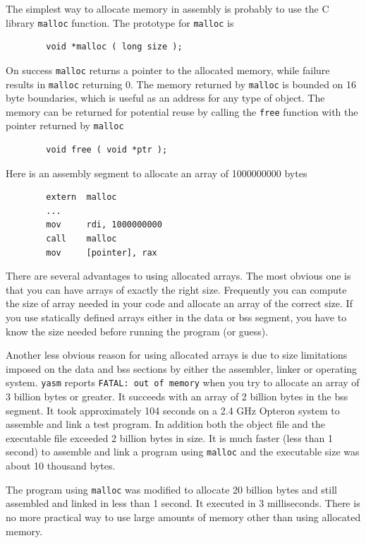 \documentclass[11pt,b5paper]{book}
\begin{document}
The simplest way to allocate memory in assembly is probably to use the C library {\tt malloc} function.
The prototype for {\tt malloc} is
\begin{verbatim}
        void *malloc ( long size );
\end{verbatim}

On success {\tt malloc} returns a pointer to the allocated memory, while failure results in {\tt malloc}
returning 0.
The memory returned by {\tt malloc} is bounded on 16 byte boundaries, which is useful as an address for
any type of object.
The memory can be returned for potential reuse by calling the {\tt free} function with the pointer
returned by {\tt malloc}
\begin{verbatim}
        void free ( void *ptr );
\end{verbatim}

Here is an assembly segment to allocate an array of 1000000000 bytes
\begin{verbatim}
        extern  malloc
        ...
        mov     rdi, 1000000000
        call    malloc
        mov     [pointer], rax
\end{verbatim}

There are several advantages to using allocated arrays.
The most obvious one is that you can have arrays of exactly the right size.
Frequently you can compute the size of array needed in your code and allocate an
array of the correct size.
If you use statically defined arrays either in the data or bss segment, you have to know the
size needed before running the program (or guess).

Another less obvious reason for using allocated arrays is due to size limitations imposed on the
data and bss sections by either the assembler, linker or operating system.
{\tt yasm} reports {\tt FATAL: out of memory} when you try to allocate an array of 3 billion bytes or greater.
It succeeds with an array of 2 billion bytes in the bss segment.
It took approximately 104 seconds on a 2.4 GHz Opteron system to assemble and link a test program.
In addition both the object file and the executable file exceeded 2 billion bytes in size.
It is much faster (less than 1 second) to assemble and link a program using {\tt malloc} and the
executable size was about 10 thousand bytes.

The program using {\tt malloc} was modified to allocate 20 billion bytes and still assembled and linked in
less than 1 second.
It executed in 3 milliseconds.
There is no more practical way to use large amounts of memory other than using allocated memory.
\end{document}
